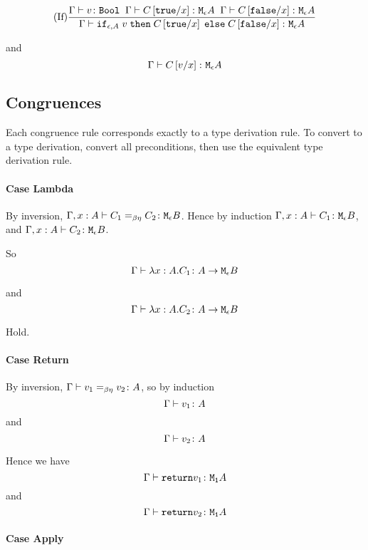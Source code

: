 {        \begin{equation}
            \treerule{If}{
                \gtyperelation{v}{\B}
                \s\s
                \gtyperelation{C\ssub{x}{\t}}{\mea}
                \s\s
                \gtyperelation{C\ssub{x}{\f}}{\mea}
            }{\gtyperelation{\ifthenelse{\e}{A}{v}{C\ssub{x}{\t}}{C\ssub{x}{\f}}}{\mea}
            }
        \end{equation}

        and 
        \begin{equation}
            \gtyperelation{C\ssub{x}{v}}{\mea}
        \end{equation}

        

        \subsection{Congruences}
    Each congruence rule corresponds exactly to a type derivation rule. To convert to a type derivation, convert all preconditions, then use the equivalent type derivation rule.

    \paragraph{Case Lambda}
        By inversion, $\berelation{\gax}{C_1}{C_2}{\meb}$. Hence by induction $\typerelation{\gax}{C_1}{\meb}$, and $\typerelation{\gax}{C_2}{\meb}$.

        So 
        \begin{equation}
            \gtyperelation{\lam{x}{A}{C_1}}{\aeb}
        \end{equation}

        and
        \begin{equation}
            \gtyperelation{\lam{x}{A}{C_2}}{\aeb}
        \end{equation}

        Hold.
    \paragraph{Case Return}
        By inversion, $\gberelation{v_1}{v_2}{A}$, so by induction $$\gtyperelation{v_1}{A}$$ and $$\gtyperelation{v_2}{A}$$

        Hence we have $$\gtyperelation{\return{v_1}}{\moa}$$
        and
        $$\gtyperelation{\return{v_2}}{\moa}$$
    \paragraph{Case Apply}

}
